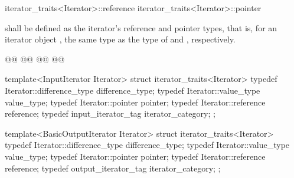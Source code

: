 \documentclass[american,twoside]{book}
\begin{document}
\begin{codeblock}
iterator_traits<Iterator>::reference
iterator_traits<Iterator>::pointer
\end{codeblock}

shall be defined as the iterator's reference and pointer types, that is, for an
iterator object , the same type as the type of  and ,
respectively. 

\begin{codeblock}
@@
@@
@@
@@
\end{codeblock}


\setcounter{Paras}{5}
\pnum
{}
\color{addclr}
\begin{codeblock}
template<InputIterator Iterator> struct iterator_traits<Iterator> {
  typedef Iterator::difference_type            difference_type;
  typedef Iterator::value_type                 value_type;
  typedef Iterator::pointer                    pointer;
  typedef Iterator::reference                  reference;
  typedef input_iterator_tag                   iterator_category;
};

template<BasicOutputIterator Iterator> struct iterator_traits<Iterator> {
  typedef Iterator::difference_type            difference_type;
  typedef Iterator::value_type                 value_type;
  typedef Iterator::pointer                    pointer;
  typedef Iterator::reference                  reference;
  typedef output_iterator_tag                  iterator_category;
};
\end{codeblock} 
\exitnote\
\color{black}
\end{document}
